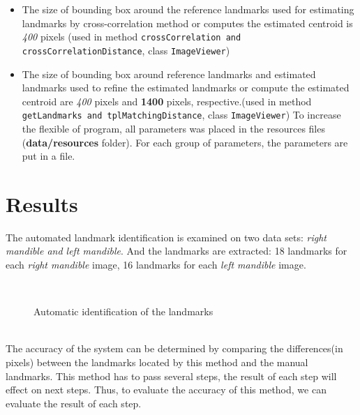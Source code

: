 \begin{itemize}
\begin{itemize}
	\end{itemize}
\item The size of bounding box around the reference landmarks used for estimating landmarks by cross-correlation method or computes the estimated centroid is \textit{400} pixels (used in method \texttt{crossCorrelation and crossCorrelationDistance}, class \texttt{ImageViewer})
\item The size of bounding box around reference landmarks and estimated landmarks used to refine the estimated landmarks or compute the estimated centroid are \textit{400} pixels and \textbf{1400} pixels, respective.(used in method \texttt{getLandmarks and tplMatchingDistance}, class \texttt{ImageViewer})
To increase the flexible of program, all parameters was placed in the resources files (\textbf{data/resources} folder). For each group of parameters, the parameters are put in a file.
\end{itemize}
\section{Results}
The automated landmark identification is examined on two data sets: \textit{right mandible and left mandible}. And the landmarks are extracted: 18 landmarks for each \textit{right mandible} image, 16 landmarks for each \textit{left mandible} image.\\
\begin{figure}[h!]
\centering
{}~~
\caption{Automatic identification of the landmarks}
\label{fig:figure_31}
\end{figure}~\\
The accuracy of the system can be determined by comparing the differences(in pixels) between the landmarks located by this method and the manual landmarks. This method has to pass several steps, the result of each step will effect on next steps. Thus, to evaluate the accuracy of this method, we can evaluate the result of each step.\\
